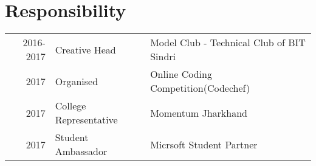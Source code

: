 \documentclass[a4paper]{manish-resume} %
\begin{document}
\begin{minipage}[t]{0.66\textwidth}
\sectionspace %


\section{Responsibility} 

\begin{tabular}{rll}
2016-2017 & Creative Head & Model Club - Technical Club of BIT Sindri\\
2017 & Organised & Online Coding Competition(Codechef)\\
2017 & College Representative & Momentum Jharkhand\\
2017 & Student Ambassador & Micrsoft Student Partner\\
\end{tabular}

\sectionspace %


\end{minipage} %








\end{document}
